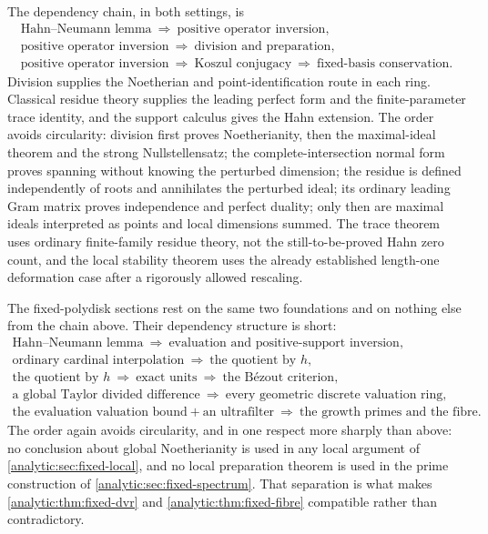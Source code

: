 \documentclass[11pt,letterpaper]{article}
\theoremstyle{definition}
\theoremstyle{remark}
\numberwithin{equation}{section}
\begin{document}
The dependency chain, in both settings, is
\begin{gather*}
 \text{Hahn--Neumann lemma}\ \Longrightarrow\
 \text{positive operator inversion},\\
 \text{positive operator inversion}\ \Longrightarrow\
 \text{division and preparation},\\
 \text{positive operator inversion}\ \Longrightarrow\
 \text{Koszul conjugacy}\ \Longrightarrow\
 \text{fixed-basis conservation}.
\end{gather*}
Division supplies the Noetherian and point-identification route in each
ring. Classical residue theory supplies the leading perfect form and the
finite-parameter trace identity, and the support calculus gives the Hahn
extension. The order avoids circularity: division first proves
Noetherianity, then the maximal-ideal theorem and the strong
Nullstellensatz; the complete-intersection normal form proves spanning
without knowing the perturbed dimension; the residue is defined
independently of roots and annihilates the perturbed ideal; its ordinary
leading Gram matrix proves independence and perfect duality; only then are
maximal ideals interpreted as points and local dimensions summed. The trace
theorem uses ordinary finite-family residue theory, not the
still-to-be-proved Hahn zero count, and the local stability theorem uses the
already established length-one deformation case after a rigorously allowed
rescaling.

The fixed-polydisk sections rest on the same two foundations and on nothing
else from the chain above. Their dependency structure is short:
\begin{gather*}
 \text{Hahn--Neumann lemma}\ \Longrightarrow\
 \text{evaluation and positive-support inversion},\\
 \text{ordinary cardinal interpolation}\ \Longrightarrow\
 \text{the quotient by }h,\\
 \text{the quotient by }h\ \Longrightarrow\
 \text{exact units}\ \Longrightarrow\ \text{the B\'ezout criterion},\\
 \text{a global Taylor divided difference}\ \Longrightarrow\
 \text{every geometric discrete valuation ring},\\
 \text{the evaluation valuation bound}+\text{an ultrafilter}\
 \Longrightarrow\ \text{the growth primes and the fibre}.
\end{gather*}
The order again avoids circularity, and in one respect more sharply than
above: no conclusion about global Noetherianity is used in any local
argument of \cref{analytic:sec:fixed-local}, and no local preparation
theorem is used in the prime construction of
\cref{analytic:sec:fixed-spectrum}. That separation is what makes
\cref{analytic:thm:fixed-dvr} and \cref{analytic:thm:fixed-fibre}
compatible rather than contradictory.
\end{document}
